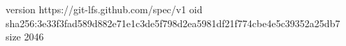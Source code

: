 version https://git-lfs.github.com/spec/v1
oid sha256:3e33f3fad589d882e71e1c3de5f798d2ea5981df21f774cbe4e5c39352a25db7
size 2046
